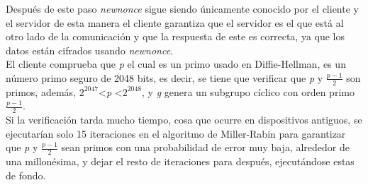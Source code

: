 \begin{enumerate}
\begin{itemize}
\begin{itemize}
			\end{itemize}
		\end{itemize}
	Después de este paso \emph{new\textunderscore nonce} sigue siendo únicamente conocido por el cliente y el servidor de esta manera el cliente garantiza que el servidor es el que está al otro lado de la comunicación y que la respuesta de este es correcta, ya que los datos están cifrados usando \emph{new\textunderscore nonce}.\\
	El cliente comprueba que \emph{p} el cual es un primo usado en Diffie-Hellman, es un número primo seguro de 2048 bits, es decir, se tiene que verificar que \emph{p} y $\frac{p-1}{2}$ son primos, además, $2^{2047}$\textless \emph{p} \textless $2^{2048}$, y \emph{g} genera un subgrupo cíclico con orden primo $\frac{p-1}{2}$.\\
	Si la verificación tarda mucho tiempo, cosa que ocurre en dispositivos antiguos, se ejecutarían solo 15 iteraciones en el algoritmo de Miller-Rabin para garantizar que \emph{p} y $\frac{p-1}{2}$ sean primos con una probabilidad de error muy baja, alrededor de una millonésima, y dejar el resto de iteraciones para después, ejecutándose estas de fondo.


\end{enumerate}
